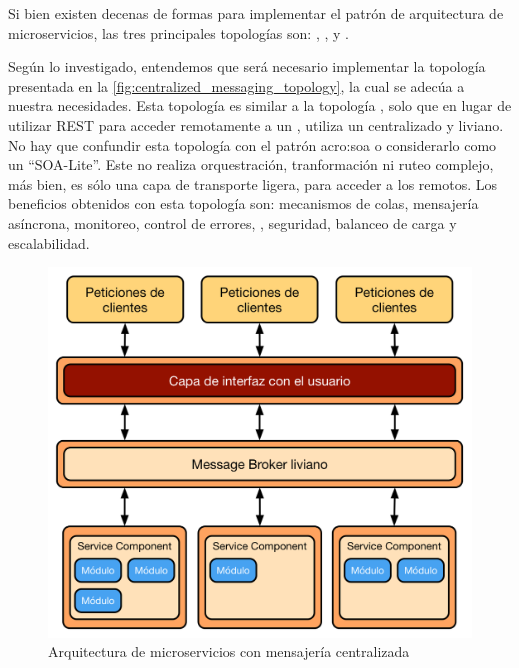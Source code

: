 Si bien existen decenas de formas para implementar el patrón de arquitectura de microservicios, las tres principales topologías son: , , y .

Según lo investigado, entendemos que será necesario implementar la topología  presentada en la \autoref{fig:centralized_messaging_topology}, la cual se adecúa a nuestra necesidades.  Esta topología es similar a la topología , solo que en lugar de utilizar REST para acceder remotamente a un , utiliza un  centralizado y liviano.  No hay que confundir esta topología con el patrón \gls{acro:soa} o considerarlo como un ``SOA-Lite''.  Este  no realiza orquestración, tranformación ni ruteo complejo, más bien, es sólo una capa de transporte ligera, para acceder a los  remotos.  Los beneficios obtenidos con esta topología son: mecanismos de colas, mensajería asíncrona, monitoreo, control de errores, , seguridad, balanceo de carga y escalabilidad.

\begin{figure}[H]
  \includegraphics[width=\linewidth]{src/images/02-capitulo-2/arquitectura-mensajeria-centralizada.png}
  \caption{Arquitectura de microservicios con mensajería centralizada}
  \label{fig:centralized_messaging_topology}
\end{figure}

